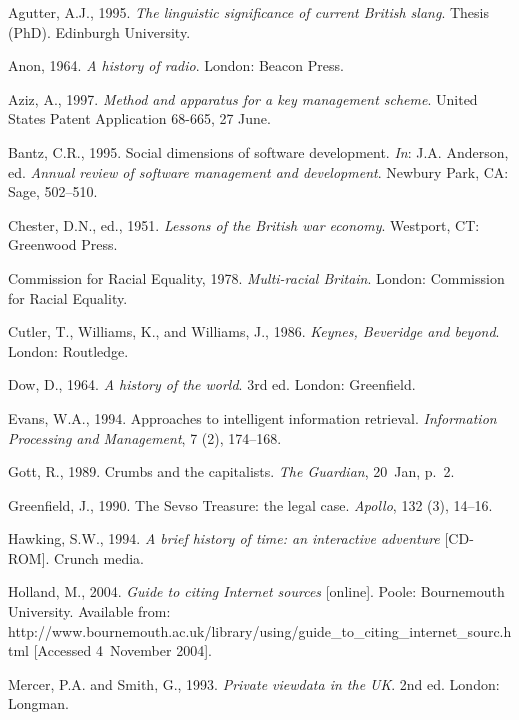 \documentclass[]{interact}
\theoremstyle{plain}%
\theoremstyle{definition}
\theoremstyle{remark}
\begin{document}
\begin{thebibliography}{}

Agutter, A.J., 1995. \emph{The linguistic significance of current British
  slang}. Thesis (PhD). Edinburgh University.

Anon, 1964. \emph{A history of radio}. London: Beacon Press.

Aziz, A., 1997. \emph{Method and apparatus for a key management scheme}. United
  States Patent Application 68-665, 27 June.

Bantz, C.R., 1995. Social dimensions of software development. \emph{In}: J.A.
  Anderson, ed. \emph{Annual review of software management and development}.
  Newbury Park, CA: Sage, 502--510.

Chester, D.N., ed., 1951. \emph{Lessons of the British war economy}. Westport,
  CT: Greenwood Press.

Commission for Racial Equality, 1978. \emph{Multi-racial Britain}. London:
  Commission for Racial Equality.

Cutler, T., Williams, K., and Williams, J., 1986. \emph{Keynes, Beveridge and
  beyond}. London: Routledge.

Dow, D., 1964. \emph{A history of the world}. 3rd ed. London: Greenfield.

Evans, W.A., 1994. Approaches to intelligent information retrieval.
  \emph{Information Processing and Management}, 7 (2), 174--168.

Gott, R., 1989. Crumbs and the capitalists. \emph{The Guardian}, 20~Jan, p.~2.

Greenfield, J., 1990. The Sevso Treasure: the legal case. \emph{Apollo},
  132 (3), 14--16.

Hawking, S.W., 1994. \emph{A brief history of time: an interactive adventure}
  [CD-ROM]. Crunch media.

Holland, M., 2004. \emph{Guide to citing Internet sources} [online]. Poole:
  Bournemouth University. Available from:
  http://www.bournemouth.ac.uk/library/using/guide\_to\_citing\_internet\_sourc.html
  [Accessed 4~November 2004].

Mercer, P.A. and Smith, G., 1993. \emph{Private viewdata in the UK}. 2nd ed.
  London: Longman.


\end{thebibliography}
\end{document}
